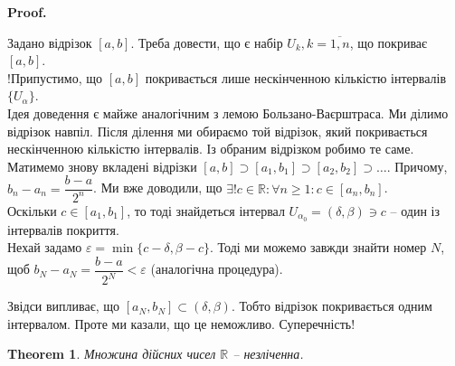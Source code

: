 \documentclass[a4paper, 14pt]{article}
\makeatletter
\def\qed{$\blacksquare$}
\theoremstyle{theoremdd}
\newtheorem{theorem}{Theorem}[subsection]
\theoremstyle{theoremdd}
\theoremstyle{theoremdd}
\theoremstyle{theoremdd}
\theoremstyle{theoremdd}
\theoremstyle{theoremdd}
\theoremstyle{theoremdd}
\theoremstyle{theoremdd}
\renewenvironment{proof}[1][Proof.\\]{\par
\pushQED{\hfill \qed}%
\normalfont \topsep6\p@\@plus6\p@\relax
\trivlist
\item\relax
{\bfseries
#1\@addpunct{.}}\hspace\labelsep\ignorespaces
}{%
\popQED\endtrivlist\@endpefalse
}
\makeatother
\begin{document}
	\begin{proof}
	Задано відрізок $[a,b]$. Треба довести, що є набір $U_k, k = \overline{1,n}$, що покриває $[a,b]$.\\
	!Припустимо, що $[a,b]$ покривається лише нескінченною кількістю інтервалів $\{U_\alpha\}$. \\ 
	Ідея доведення є майже аналогічним з лемою Бользано-Ваєрштраса. Ми ділимо відрізок навпіл. Після ділення ми обираємо той відрізок, який покривається нескінченною кількістю інтервалів. Із обраним відрізком робимо те саме.\\
	Матимемо знову вкладені відрізки $[a,b] \supset [a_1,b_1] \supset [a_2,b_2] \supset \dots$. Причому, $b_n - a_n = \dfrac{b-a}{2^n}$. Ми вже доводили, що $\exists! c \in \mathbb{R}: \forall n \geq 1: c \in [a_n,b_n]$.\\
	Оскільки $c \in [a_1,b_1]$, то тоді знайдеться інтервал $U_{\alpha_0} = (\delta,\beta) \ni c$ -- один із інтервалів покриття.\\
	Нехай задамо $\varepsilon = \min \{ c-\delta, \beta-c \}$. Тоді ми можемо завжди знайти номер $N$, щоб $b_N - a_N = \dfrac{b-a}{2^N} < \varepsilon$ (аналогічна процедура).
	\begin{figure}[H]
	\centering
	\end{figure}
	Звідси випливає, що $[a_N,b_N] \subset (\delta, \beta)$. Тобто відрізок покривається одним інтервалом. Проте ми казали, що це неможливо. Суперечність!
	\end{proof}
		
	\begin{theorem}
	Множина дійсних чисел $\mathbb{R}$ -- незліченна.
	\end{theorem}
	
\end{document}
